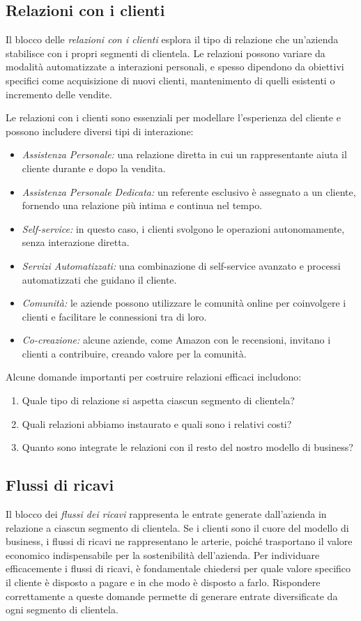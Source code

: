 \subsection*{Relazioni con i clienti}
Il blocco delle \textit{relazioni con i clienti} esplora il tipo di relazione che un’azienda stabilisce con i propri segmenti di clientela. Le relazioni possono variare da modalità automatizzate a interazioni personali, e spesso dipendono da obiettivi specifici come acquisizione di nuovi clienti, mantenimento di quelli esistenti o incremento delle vendite.

Le relazioni con i clienti sono essenziali per modellare l’esperienza del cliente e possono includere diversi tipi di interazione:
\begin{itemize}
    \item \textit{Assistenza Personale:} una relazione diretta in cui un rappresentante aiuta il cliente durante e dopo la vendita.
    \item \textit{Assistenza Personale Dedicata:} un referente esclusivo è assegnato a un cliente, fornendo una relazione più intima e continua nel tempo.
    \item \textit{Self-service:} in questo caso, i clienti svolgono le operazioni autonomamente, senza interazione diretta.
    \item \textit{Servizi Automatizzati:} una combinazione di self-service avanzato e processi automatizzati che guidano il cliente.
    \item \textit{Comunità:} le aziende possono utilizzare le comunità online per coinvolgere i clienti e facilitare le connessioni tra di loro.
    \item \textit{Co-creazione:} alcune aziende, come Amazon con le recensioni, invitano i clienti a contribuire, creando valore per la comunità.
\end{itemize}
Alcune domande importanti per costruire relazioni efficaci includono:
\begin{enumerate}
    \item Quale tipo di relazione si aspetta ciascun segmento di clientela?
    \item Quali relazioni abbiamo instaurato e quali sono i relativi costi?
    \item Quanto sono integrate le relazioni con il resto del nostro modello di business?
\end{enumerate}

\subsection*{Flussi di ricavi}
Il blocco dei \textit{flussi dei ricavi} rappresenta le entrate generate dall’azienda in relazione a ciascun segmento di clientela. Se i clienti sono il cuore del modello di business, i flussi di ricavi ne rappresentano le arterie, poiché trasportano il valore economico indispensabile per la sostenibilità dell’azienda. Per individuare efficacemente i flussi di ricavi, è fondamentale chiedersi per quale valore specifico il cliente è disposto a pagare e in che modo è disposto a farlo. Rispondere correttamente a queste domande permette di generare entrate diversificate da ogni segmento di clientela.

